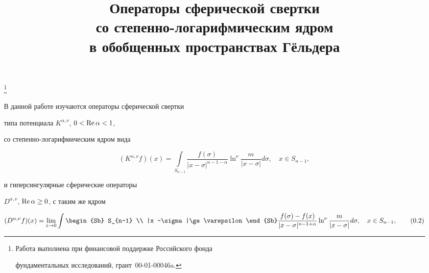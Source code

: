 

\title{Операторы сферической свертки \\


со степенно-логарифмическим ядром \\


в обобщенных пространствах Г\"ельдера}


\thanks{Работа выполнена при финансовой поддержке Российского фонда


фундаментальных исследований, грант \No\,00-01-00046a.}





\date{}




\pagestyle{plain} %







\maketitle


\label{begin}








В данной работе изучаются операторы сферической свертки


типа потенциала $K^{\alpha,\nu}$, $0 < \operatorname{Re} \alpha <1$,


со степенно-логарифмическим ядром вида


\begin{equation}


(K^{\alpha,\nu} f)(x) = \int \limits_{S_{n-1}} \frac{f(\sigma)}


{|x-\sigma|^{n-1-\alpha}} \ln^\nu \frac{m}{|x-\sigma|} d\sigma,


\quad x\in S_{n-1},\tag{0.1}


\end{equation}


и гиперсингулярные сферические операторы


$D^{\alpha,\nu}$, $\operatorname{Re} \alpha \ge 0$, с таким же ядром


\begin{equation}


(D^{\alpha,\nu}f)(x) =  \lim _{\varepsilon


\to 0} \int \limits \begin{Sb} S_{n-1} \\ |x -\sigma|\ge\varepsilon


\end{Sb}


\frac{f(\sigma) - f(x)}{|x-\sigma|^{n-1+\alpha}} \ln^\nu \frac{m}


{|x-\sigma|}d\sigma, \quad x\in S_{n-1},\tag{0.2}


\end{equation}


